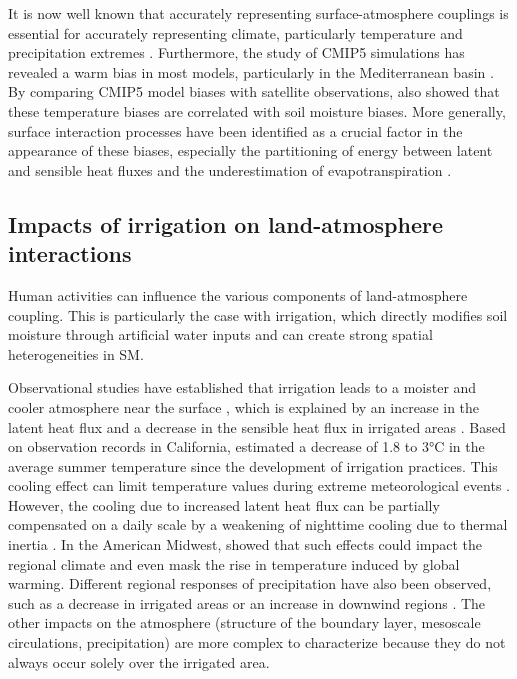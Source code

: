 It is now well known that accurately representing surface-atmosphere couplings is essential for accurately representing climate, particularly temperature and precipitation extremes \citep{jaeger_impact_2011, van_den_hurk_acceleration_2011}. Furthermore, the study of CMIP5 simulations has revealed a warm bias in most models, particularly in the Mediterranean basin \citep{christensen_temperature_2012, mueller_systematic_2014}. By comparing CMIP5 model biases with satellite observations, \citet{al-yaari_satellite-based_2019} also showed that these temperature biases are correlated with soil moisture biases. More generally, surface interaction processes have been identified as a crucial factor in the appearance of these biases, especially the partitioning of energy between latent and sensible heat fluxes and the underestimation of evapotranspiration \citep{cheruy_combined_2013, cheruy_role_2014}. 

\subsection{Impacts of irrigation on land-atmosphere interactions}
\label{sec:irrig_landatmosphere}
Human activities can influence the various components of land-atmosphere coupling. This is particularly the case with irrigation, which directly modifies soil moisture through artificial water inputs and can create strong spatial heterogeneities in SM. 

Observational studies have established that irrigation leads to a moister and cooler atmosphere near the surface \citep{bonfils_empirical_2007, mcdermid_irrigation_2023}, which is explained by an increase in the latent heat flux and a decrease in the sensible heat flux in irrigated areas \citep{rappin_landatmosphere_2022, boone_land_2025}.
Based on observation records in California, \citet{bonfils_empirical_2007} estimated a decrease of 1.8 to 3°C in the average summer temperature since the development of irrigation practices. This cooling effect can limit temperature values during extreme meteorological events \citep{thiery_present-day_2017, thiery_warming_2020}. However, the cooling due to increased latent heat flux can be partially compensated on a daily scale by a weakening of nighttime cooling due to thermal inertia \citep{chen_irrigation_2018}.
In the American Midwest, \cite{nocco_observation_2019} showed that such effects could impact the regional climate and even mask the rise in temperature induced by global warming. Different regional responses of precipitation have also been observed, such as a decrease in irrigated areas \citep{alter_rainfall_2015} or an increase in downwind regions \citep{deangelis_evidence_2010}.
The other impacts on the atmosphere (structure of the boundary layer, mesoscale circulations, precipitation) are more complex to characterize because they do not always occur solely over the irrigated area.

